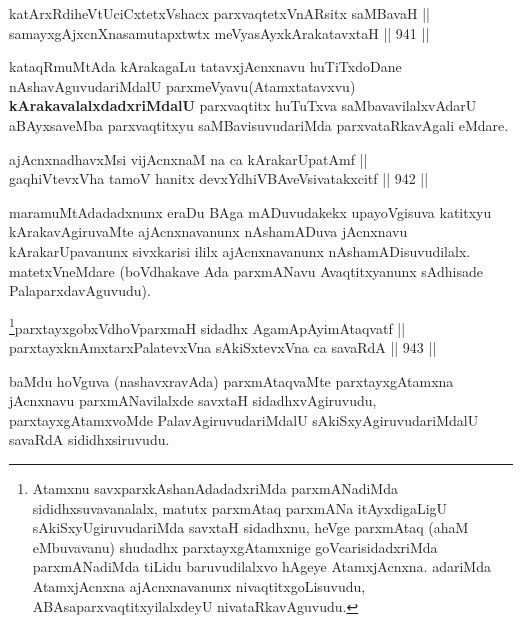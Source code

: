 \begin{shl}
katArxRdiheVtUciCxtetxVshacx parxvaqtetxVnARsitx saMBavaH || \\
samayxgAjxcnXnasamutapxtwtx meVyasAyxkArakatavxtaH \hfill || 941 ||  
\end{shl}

\begin{artha}
kataqRmuMtAda kArakagaLu tatavxjAcnxnavu huTiTxdoDane nAshavAguvudariMdalU parxmeVyavu(Atamxtatavxvu) \textbf{kArakavalalxdadxriMdalU} parxvaqtitx huTuTxva saMbavavilalxvAdarU aBAyxsaveMba parxvaqtitxyu saMBavisuvudariMda parxvataRkavAgali eMdare.
\end{artha}

\begin{shl}
ajAcnxnadhavxMsi vijAcnxnaM na ca kArakarUpatAmf || \\
gaqhiVtevxVha tamoV hanitx devxYdhiVBAveV\s sivatakxcitf \hfill || 942 ||  
\end{shl}

\begin{artha}
maramuMtAdadadxnunx eraDu BAga mADuvudakekx upa\-\break yoVgisuva katitxyu kArakavAgiruvaMte ajAcnxnavanunx nAshamADuva jAcnxnavu kArakarUpavanunx sivxkarisi ililx ajAcnxnavanunx nAshamADisuvudilalx. matetxVneMdare (boVdhakave Ada parxmANavu Avaqtitxyanunx sAdhisade PalaparxdavAguvudu).
\end{artha}


\begin{shl}
\footnote{Atamxnu savxparxkAshanAdadadxriMda parxmANadiMda sididhxsuvavanalalx, matutx parxmAtaq parxmANa itAyxdigaLigU sAkiSxyUgiruvudariMda savxtaH sidadhxnu, heVge parxmAtaq (ahaM eMbuvavanu) shudadhx parxtayxgAtamxnige goVcarisidadxriMda parxmANadiMda  tiLidu baruvudilalxvo hAgeye AtamxjAcnxna. adariMda AtamxjAcnxna ajAcnxnavanunx nivaqtitxgoLisuvudu, ABAsaparxvaqtitxyilalxdeyU nivataRkavAguvudu.}parxtayxgobxVdhoV\s parxmaH sidadhx AgamApAyimAtaqvatf || \\
parxtayxknAmxtarxPalatevxVna sAkiSxtevxVna ca savaRdA \hfill || 943 ||  
\end{shl}

\begin{artha}
baMdu hoVguva (nashavxravAda) parxmAtaqvaMte parxtayxgAtamxna jAcnxnavu parxmANavilalxde savxtaH sidadhxvAgiruvudu, parxtayxgAtamxvoMde PalavAgiruvudariMdalU sAkiSxyAgiruvudariMdalU savaRdA sididhxsiruvudu.
\end{artha}


